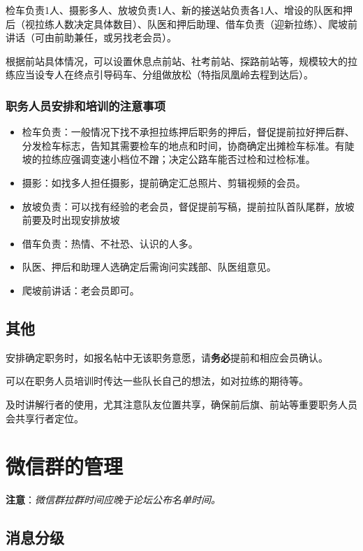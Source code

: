 \documentclass[UTF8]{ctexart}
\begin{document}
检车负责1人、摄影多人、放坡负责1人、新的接送站负责各1人、增设的队医和押后（视拉练人数决定具体数目）、队医和押后助理、借车负责（迎新拉练）、爬坡前讲话（可由前助兼任，或另找老会员）。

根据前站具体情况，可以设置休息点前站、社考前站、探路前站等，规模较大的拉练应当设专人在终点引导码车、分组做放松（特指凤凰岭去程到达后）。

\subsubsection{职务人员安排和培训的注意事项}

\begin{itemize}[nosep,left=2em]
    \item 检车负责：一般情况下找不承担拉练押后职务的押后，督促提前拉好押后群、分发检车标志，告知其需要检车的地点和时间，协商确定出摊检车标准。有陡坡的拉练应强调变速小档位不蹭；决定公路车能否过检和过检标准。
    \item 摄影：如找多人担任摄影，提前确定汇总照片、剪辑视频的会员。
    \item 放坡负责：可以找有经验的老会员，督促提前写稿，提前拉队首队尾群，放坡前要及时出现安排放坡
    \item 借车负责：热情、不社恐、认识的人多。
    \item 队医、押后和助理人选确定后需询问实践部、队医组意见。
    \item 爬坡前讲话：老会员即可。
\end{itemize}

\subsection{其他}

安排确定职务时，如报名帖中无该职务意愿，请\textbf{务必}提前和相应会员确认。

可以在职务人员培训时传达一些队长自己的想法，如对拉练的期待等。

及时讲解行者的使用，尤其注意队友位置共享，确保前后旗、前站等重要职务人员会共享行者定位。

\section{微信群的管理}
\textbf{注意}：\textit{微信群拉群时间应晚于论坛公布名单时间。}

\subsection{消息分级}
\end{document}
